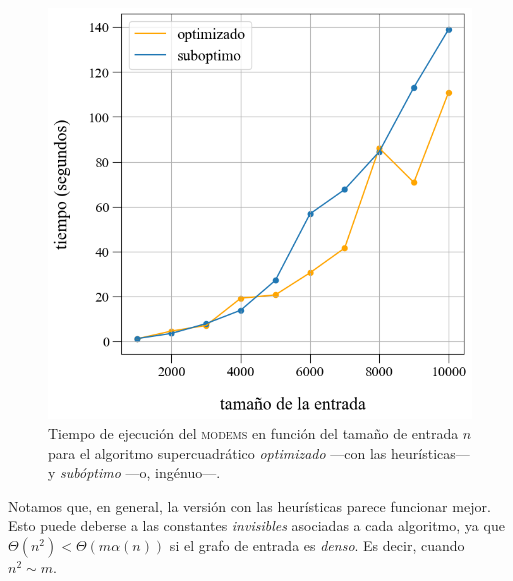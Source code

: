 \vspace{0.5em}
\begin{figure}[!htbp]
    \includegraphics[scale=0.4, clip]{./files/src/.media/comparacion_DSU.png}
    \caption{Tiempo de ejecución del \textsc{modems} en función del tamaño de entrada $n$ para el algoritmo supercuadrático \textit{optimizado} ---con las heurísticas--- y \textit{subóptimo} ---o, ingénuo---.}\label{fig2}
\end{figure}

Notamos que, en general, la versión con las heurísticas parece funcionar mejor. Esto puede deberse a las constantes \textit{invisibles} asociadas a cada algoritmo, ya que $\Theta(n^2) < \Theta(m\alpha(n))$ si el grafo de entrada es \textit{denso}. Es decir, cuando $n^2 \sim m$. 
